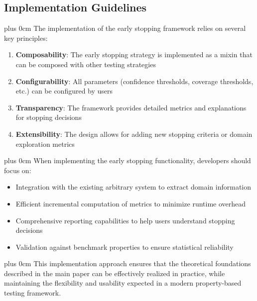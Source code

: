 \documentclass[11pt,a4paper]{article}
\newcommand{\justifytext}{\leftskip=0pt \rightskip=0pt plus 0cm}
\begin{document}
\subsection{Implementation Guidelines}

\justifytext
The implementation of the early stopping framework relies on several key principles:

\begin{tcolorbox}[
  colback=blue!5!white,
  colframe=blue!75!black,
  title=Implementation Principles,
  fonttitle=\bfseries
]
\begin{enumerate}
\item \textbf{Composability}: The early stopping strategy is implemented as a mixin that can be composed with other testing strategies
\item \textbf{Configurability}: All parameters (confidence thresholds, coverage thresholds, etc.) can be configured by users
\item \textbf{Transparency}: The framework provides detailed metrics and explanations for stopping decisions
\item \textbf{Extensibility}: The design allows for adding new stopping criteria or domain exploration metrics
\end{enumerate}
\end{tcolorbox}

\justifytext
When implementing the early stopping functionality, developers should focus on:

\begin{itemize}
\item Integration with the existing arbitrary system to extract domain information
\item Efficient incremental computation of metrics to minimize runtime overhead
\item Comprehensive reporting capabilities to help users understand stopping decisions
\item Validation against benchmark properties to ensure statistical reliability
\end{itemize}

\justifytext
This implementation approach ensures that the theoretical foundations described in the main paper can be effectively realized in practice, while maintaining the flexibility and usability expected in a modern property-based testing framework.
\end{document}
